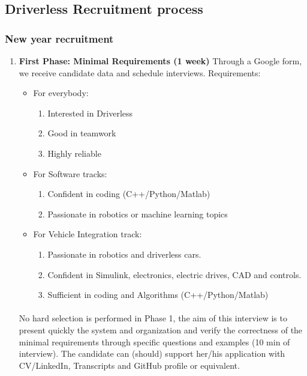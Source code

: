 \documentclass[graybox]{svmult}
\begin{document}
\subsection{Driverless Recruitment process}
\subsubsection{New year recruitment}
\begin{enumerate}
  \item \textbf{First Phase: Minimal Requirements (1 week)}
  Through a Google form, we receive candidate data and schedule interviews.
  Requirements:
  \begin{itemize}
    \item For everybody:
    \begin{enumerate}
      \item Interested in Driverless
      \item Good in teamwork
      \item Highly reliable
    \end{enumerate}
    \item For Software tracks:
    \begin{enumerate}
      \item Confident in coding (C++/Python/Matlab)
      \item Passionate in robotics or machine learning topics
    \end{enumerate}
    \item For Vehicle Integration track:
    \begin{enumerate}
    	\item Passionate in robotics and driverless cars.
    	\item Confident in Simulink, electronics, electric drives, CAD and controls.
        \item Sufficient in coding and Algorithms (C++/Python/Matlab)
    \end{enumerate}
  \end{itemize}

\paragraph{}
No hard selection is performed in Phase 1, the aim of this interview is to present quickly the system and organization and verify the correctness of the minimal requirements through specific questions and examples (10 min of interview). The candidate can (should) support her/his application with CV/LinkedIn, Transcripts and GitHub profile or equivalent.


\end{enumerate}
\end{document}
